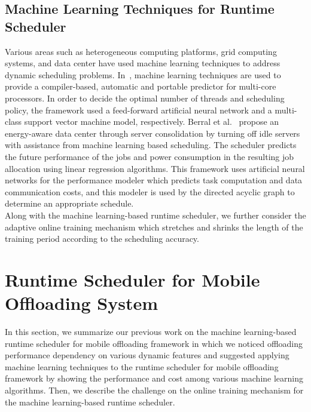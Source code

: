\documentclass[10pt, conference, compsocconf]{IEEEtran}
\begin{document}
\subsection{Machine Learning Techniques for Runtime Scheduler}
%
Various areas such as heterogeneous computing platforms, grid computing
systems, and data center have used machine learning techniques to
address dynamic scheduling problems.
%
In~\cite{zheng}, machine learning techniques are used to provide a
compiler-based, automatic and portable predictor for multi-core
processors.
%
In order to decide the optimal number of threads and scheduling policy,
the framework used a feed-forward artificial neural network and a
multi-class support vector machine model, respectively.
%
Berral et al.~\cite{josep} propose an energy-aware
data center through server consolidation by turning off idle servers
with assistance from machine learning based scheduling.
%
The scheduler predicts the future performance of the jobs and power
consumption in the resulting job allocation using linear regression
algorithms.
%
This framework uses artificial neural networks for the performance
modeler which predicts task computation and data communication costs,
and this modeler is used by the directed acyclic graph to determine an
appropriate schedule.\\
%
\indent Along with the machine learning-based runtime scheduler, we
further consider the adaptive online training mechanism which stretches
and shrinks the length of the training period according to the scheduling
accuracy.
%
\section{Runtime Scheduler for Mobile Offloading System}
%
In this section, we summarize our previous work on the machine
learning-based runtime scheduler for mobile offloading framework in
which we noticed offloading performance dependency on various dynamic
features and suggested applying machine learning techniques to the
runtime scheduler for mobile offloading framework by showing the
performance and cost among various machine learning algorithms.
%
Then, we describe the challenge on the online training mechanism for the
machine learning-based runtime scheduler.
% 
\end{document}
